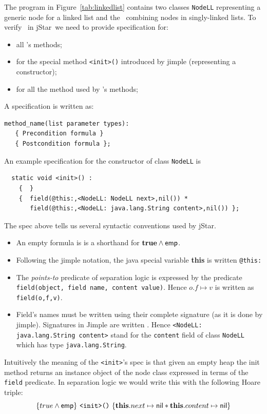 \documentclass[11pt]{article}
\newcommand{\jStar}{{\sf jStar}}
\newcommand{\psto}{\mapsto}
\newcommand{\emp}{{\sf emp}}
\newcommand{\nil}{{\sf nil}}
\newcommand{\true}{\mathbf{true}}
\newcommand{\this}{\mathbf{this}}
\begin{document}
The program in Figure~\ref{tab:linkedlist} contains two classes
{\tt NodeLL}  representing a generic node for a linked list
and the \linkedlist \  combining nodes in 
singly-linked lists. To verify  \linkedlist \ in \jStar \ we
need to provide specification for:
\begin{itemize}
\item all
\linkedlist's methods;
\item for the special method {\tt <init>()} introduced by jimple
  (representing a constructor);
\item for all the method used by \linkedlist's methods;
\end{itemize}
A specification is written as:
\begin{verbatim}
method_name(list parameter types): 
   { Precondition formula } 
   { Postcondition formula };
\end{verbatim}
An example specification for the constructor of class {\tt NodeLL} is
\begin{verbatim}
  static void <init>() : 
    {  } 
    {  field(@this:,<NodeLL: NodeLL next>,nil()) * 
       field(@this:,<NodeLL: java.lang.String content>,nil()) };
\end{verbatim}
%
The spec above tells us several syntactic conventions used by \jStar.
\begin{itemize}
\item An empty formula is is a shorthand for $\true \wedge \emp$.
\item Following the jimple notation, the java special variable {\bf
    this} is written {\tt @this:}
\item The {\em points-to} predicate of separation logic is expressed by the
  predicate {\tt field(object, field name, content value)}. Hence 
  $o.f\psto v$ is written as {\tt field(o,f,v)}.
\item Field's names must be written using their complete signature (as
  it is done by jimple). Signatures in Jimple are  written {\tt <ClassName: TypeOfField NameOfField>}.
  Hence {\tt <NodeLL: java.lang.String content>} stand for the {\tt content} field of class {\tt NodeLL} 
  which has type {\tt java.lang.String}.
\end{itemize}
Intuitively the meaning of the {\tt <init>}'s spec is that given an
empty heap the init method returns an instance object of the node
class expressed in terms of the {\tt field} predicate.  In separation
logic we would write this with the following Hoare triple:
\[
\{ true \wedge \emp \} \ \texttt{<init>()} \ \{ \this.next \psto \nil * \this.content \psto \nil \}
\]
\end{document}
